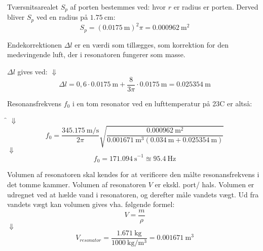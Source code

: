 Tværsnitsarealet $S_{p}$ af porten bestemmes ved: 
\Sp 
hvor ${r}$ er radius er porten. 
Derved bliver $S_{p}$ ved en radius på ${\SI{1.75}{\centi \meter}}$:  
\begin{equation}
S_{p} = ({\SI{0,0175}{\meter}})^{2}\pi = {\SI{0,000962}{\meter^{2}}}	
\end{equation}  

Endekorrektionen $\Delta l$ er en værdi som tillægges, som korrektion for den medsvingende luft, der i resonatoren fungerer som masse. 

$\Delta l$ gives ved: \deltal
$\Downarrow$
\begin{equation}
		\Delta l = 0,6 \cdot {\SI{0,0175}{\meter}} + \frac{8}{3\pi} \cdot {\SI{0,0175}{\meter}} = {\SI{0,025354}{\meter}} 
\end{equation}

Resonansfrekvens $f_{0}$ i en tom resonator ved en lufttemperatur på 23\degree C er altså:

\f
$\Downarrow$   
\begin{equation}
		f_{0} = \frac{\SI{345,175}{\meter / \second}}{2\pi}\sqrt{\frac{\SI{0,000962}{\meter^{2}}}{{\SI{0,001671}{\meter^{3}}}({\SI{0,034}{\meter}}+{\SI{0,025354}{\meter}})}} 
	\end{equation}	
$\Downarrow$
\begin{equation}
	f_{0} = {\SI{171,094}{\second}^{-1}} \approxeq {\SI{95,4}{\hertz}} 	
	\end{equation}
	




Volumen af resonatoren skal kendes for at verificere den målte resonansfrekvens i det tomme kammer. 
Volumen af resonatoren $V$ er ekskl. port/ hals. Volumen er udregnet ved at hælde vand i resonatoren, og derefter måle vandets vægt. Ud fra vandets vægt kan volumen gives vha. følgende formel:  
\begin{equation}
  V=\frac{m}{\rho}
  \label{eq:vformel}
\end{equation}
$\Downarrow$
\begin{equation}
V_{resonator}=\frac{\SI{1,671}{\kilo\gram}}{\SI{1000}{\kilo \gram \per \meter^{3}}}={\SI{0,001671}{\meter^{3}}}
\end{equation}


